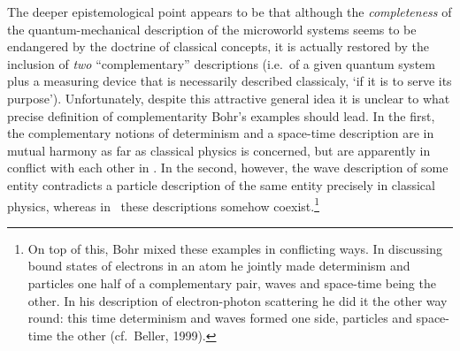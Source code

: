 \documentclass[12pt,titlepage]{article}
\begin{document}
 The deeper epistemological point appears to be that although the {\it completeness} of the quantum-mechanical description of  the microworld systems seems to be endangered by the doctrine of classical concepts, it is actually restored by the inclusion of {\it two} ``complementary'' descriptions (i.e.\ of a given quantum system plus a measuring device that is necessarily described classicaly, `if it is to serve its purpose'). Unfortunately, despite this attractive general idea it is unclear to what precise definition of complementarity Bohr's examples should lead. In the first, the complementary notions of determinism and a space-time description are in mutual harmony as far as classical physics is concerned, but are apparently in conflict with each other in \qm. In the second, however, the wave description of some entity contradicts a particle description of the same entity precisely in classical physics, whereas in \qm\ these descriptions somehow coexist.\footnote{On top of this, Bohr mixed these examples in conflicting ways. In discussing bound states of electrons in an atom he jointly made determinism and particles one half of a complementary pair, waves and space-time being the other. In his description of electron-photon scattering he did it the other way round: this time determinism and waves formed one side, particles and space-time the other (cf.\ Beller, 1999).}
\end{document}
